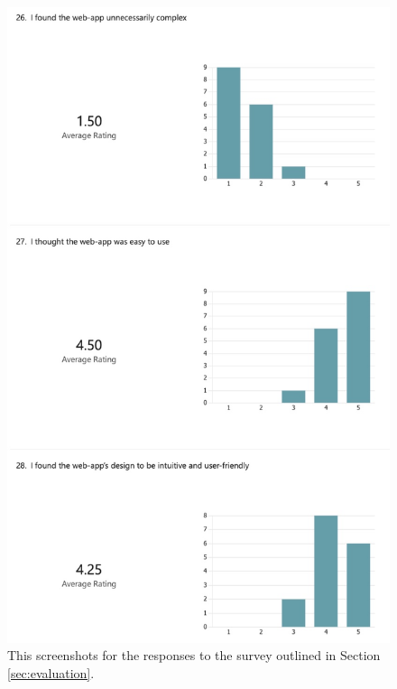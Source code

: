 \documentclass{l4proj}
\begin{document}
\begin{appendices}
\begin{figure}[H]
    \centering
    \includegraphics[width=0.75\linewidth]{dissertation/images/eval-7.jpeg}    
    \caption{This screenshots for the responses to the survey outlined in Section \ref{sec:evaluation}.}
    \label{fig:eval-survey-7} 
\end{figure}


\end{appendices}
\end{document}
